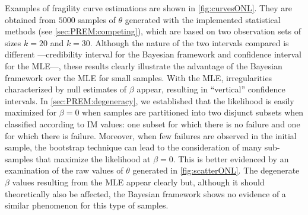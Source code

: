 Examples of fragility curve estimations are shown in \cref{fig:curvesONL}. They are obtained from $5000$ samples of $\theta$ generated with the implemented statistical methods (see \cref{sec:PREM:competing}), which are based on two observation sets of sizes $k=20$ and $k=30$. Although the nature of the two intervals compared is different ---credibility interval for the Bayesian framework and confidence interval for the MLE---, these results clearly illustrate the advantage of the Bayesian framework over the MLE for small samples. With the MLE, irregularities characterized by null estimates of $\beta$ appear, resulting in ``vertical'' confidence intervals. In \cref{sec:PREM:degeneracy}, we established that the likelihood is easily maximized for $\beta=0$ when samples are partitioned into two disjunct subsets when classified according to IM values: one subset for which there is no failure and one for which there is failure. Moreover, when few failures are observed in the initial sample, the bootstrap technique can lead to the consideration of many sub-samples that maximize the likelihood at $\beta=0$. This is better evidenced by an examination of the raw values of $\theta$ generated in \cref{fig:scatterONL}. The degenerate $\beta$ values resulting from the MLE appear clearly but, although it should theoretically also be affected, the Bayesian framework shows no evidence of a similar phenomenon for this type of samples.


